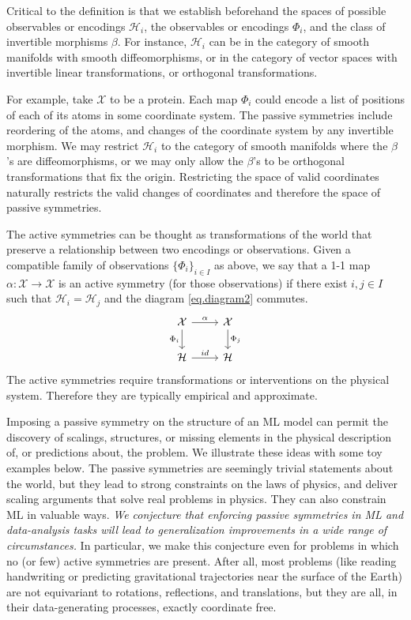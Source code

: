 \documentclass{article}
\theoremstyle{plain}
\theoremstyle{definition}
\theoremstyle{remark}
\newcommand{\bernhard}[1]{ \textcolor{red}{\textbf{~B: #1}}}
\begin{document}
Critical to the definition is that we establish beforehand the spaces of possible observables or encodings $\mathcal H_i$, the observables or encodings $\Phi_i$, and the class of invertible morphisms $\beta$. For instance, $\mathcal H_i$ can be in the category of smooth manifolds with smooth diffeomorphisms, or in the category of vector spaces with invertible linear transformations, or orthogonal transformations.   

For example, take $\mathcal X$ to be a protein. Each map $\Phi_i$ could encode a list of positions of each of its atoms in some coordinate system. The passive symmetries include reordering of the atoms, and changes of the coordinate system by any invertible morphism. We may restrict $\mathcal H_i$ to the category of smooth manifolds where the $\beta$'s are diffeomorphisms, or we may only allow the $\beta$'s to be orthogonal transformations that fix the origin. Restricting the space of valid coordinates naturally restricts the valid changes of coordinates and therefore the space of passive symmetries.

The active symmetries can be thought as transformations of the world that preserve a relationship between two encodings or observations. 
Given a compatible family of observations $\{\Phi_i\}_{i\in I}$ as above, we say that a 1-1 map $\alpha:\mathcal X \to \mathcal X$ is an active symmetry (for those observations) if there exist $i,j\in I$ such that $\mathcal H_i = \mathcal H_j$ and the diagram  \eqref{eq.diagram2} commutes. 
\begin{equation}\label{eq.diagram2}
\begin{tikzcd}[]
  {\cal X}\arrow[r,"\alpha"] \arrow[d,"\Phi_i",swap] & {\cal X}  \arrow[d,"\Phi_j"]\\
{\mathcal H} \arrow[r,"id"]  & {\mathcal H} 
\end{tikzcd}
\end{equation}
The active symmetries require transformations or interventions on the physical system. Therefore they are typically empirical and approximate.

Imposing a passive symmetry on the structure of an ML model can permit the discovery of scalings, structures, or missing elements in the physical description of, or predictions about, the problem.
We illustrate these ideas with some toy examples below.
The passive symmetries are seemingly trivial statements about the world, but they lead to strong constraints on the laws of physics, and deliver scaling arguments that solve real problems in physics.
They can also constrain ML in valuable ways.
\emph{We conjecture that enforcing passive symmetries in ML and data-analysis tasks will lead to generalization improvements in a wide range of circumstances.}
In particular, we make this conjecture even for problems in which no (or few) active symmetries are present.
After all, most problems (like reading handwriting or predicting gravitational trajectories near the surface of the Earth) are not equivariant to rotations, reflections, and translations, but they are all, in their data-generating processes, exactly coordinate free. %
\end{document}
